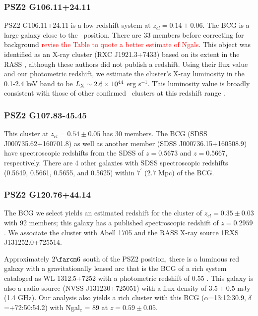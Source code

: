 \documentclass[apj, revtex4-1]{emulateapj}
\newcommand{\editorial}[1]{\textcolor{red}{#1}}
\begin{document}
\subsubsection{PSZ2 G106.11+24.11}  %
PSZ2 G106.11+24.11 is a low redshift system at $z_{cl} = 0.14 \pm 0.06$.  The BCG is a large galaxy close to the \planck\ position.  There are 33 members before correcting for background \editorial{revise the Table to quote a better estimate of Ngals}. This object was identified as an X-ray cluster (RXC J1921.3+7433) based on its extent in the RASS \citep{Bohringer2000}, although these authors did not publish a redshift. Using their flux value and our photometric redshift, we estimate the cluster's X-ray luminosity in the 0.1-2.4 keV band to be $L_{\rm X} \sim 2.6\times 10^{44}$ erg s$^{-1}$. This luminosity value is broadly consistent with those of other confirmed \planck\ clusters at this redshift range \citep{PlanckCollaboration2015}.

\subsubsection{PSZ2 G107.83-45.45}  %
This cluster at $z_{cl} = 0.54 \pm 0.05$ has 30 members.  The BCG (SDSS J000735.62+160701.8) as well as another member (SDSS J000736.15+160508.9) have spectroscopic redshifts from the SDSS of $z=0.5673$ and $z=0.5667$, respectively.  There are 4 other galaxies with SDSS spectroscopic redshifts (0.5649, 0.5661, 0.5655, and 0.5625) within $7^\prime$ (2.7 Mpc) of the BCG.

\subsubsection{PSZ2 G120.76+44.14} %
The BCG we select yields an estimated redshift for the cluster of $z_{cl} = 0.35 \pm 0.03$ with 92 members; this galaxy has a published spectroscopic redshift of $z=0.2959$ \citep{Huchra1990}.  We associate the cluster with Abell 1705 and the RASS X-ray source 1RXS J131252.0+725514.

Approximately $2\farcm6$ south of the PSZ2 position, there is a luminous red galaxy with a gravitationally lensed arc that is the BCG of a rich system cataloged as WL 1312.5+7252 with a photometric redshift of 0.55 \citep{Dahle2003}. This galaxy is also a radio source (NVSS J131230+725051) with a flux density of $3.5 \pm 0.5$ mJy (1.4 GHz).  Our analysis also yields a rich cluster with this BCG ($\alpha$=13:12:30.9, $\delta$=+72:50:54.2) with Ngal$_c$ = 89 at $z=0.59 \pm 0.05$.
\end{document}
